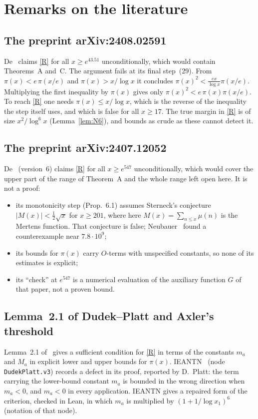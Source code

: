 \documentclass{amsart}
\theoremstyle{definition}
\theoremstyle{remark}
\theoremstyle{plain}
\numberwithin{equation}{section}
\begin{document}
\section{Remarks on the literature}\label{sec:lit}

\subsection{The preprint arXiv:2408.02591}
De~\cite{De24b} claims \eqref{R} for all $x\ge e^{43.51}$ unconditionally, which would contain Theorems~A and~C. The argument fails at its final step~(29). From $\pi(x)<e\,\pi(x/e)$ and $\pi(x)>x/\log x$ it concludes $\pi(x)^2<\frac{ex}{\log x}\pi(x/e)$. Multiplying the first inequality by $\pi(x)$ gives only $\pi(x)^2<e\,\pi(x)\pi(x/e)$. To reach \eqref{R} one needs $\pi(x)\le x/\log x$, which is the reverse of the inequality the step itself uses, and which is false for all $x\ge17$. The true margin in \eqref{R} is of size $x^2/\log^6x$ (Lemma~\ref{lem:N6}), and bounds as crude as these cannot detect it.

\subsection{The preprint arXiv:2407.12052}
De~\cite{De24a} (version~6) claims \eqref{R} for all $x\ge e^{547}$ unconditionally, which would cover the upper part of the range of Theorem~A and the whole range left open here. It is not a proof:
\begin{itemize}
\item its monotonicity step (Prop.~6.1) assumes Sterneck's conjecture $|M(x)|<\frac12\sqrt x$ for $x\ge201$, where here $M(x)=\sum_{n\le x}\mu(n)$ is the Mertens function. That conjecture is false; Neubauer~\cite{Neu63} found a counterexample near $7.8\cdot10^9$;
\item its bounds for $\pi(x)$ carry $O$-terms with unspecified constants, so none of its estimates is explicit;
\item its ``check'' at $e^{547}$ is a numerical evaluation of the auxiliary function $G$ of that paper, not a proven bound.
\end{itemize}

\subsection{Lemma~2.1 of Dudek--Platt and Axler's threshold}\label{sec:DP}
Lemma~2.1 of~\cite{DP15} gives a sufficient condition for \eqref{R} in terms of the constants $m_a$ and $M_a$ in explicit lower and upper bounds for $\pi(x)$. IEANTN~\cite{IEANTN} (node \texttt{DudekPlatt.v3}) records a defect in its proof, reported by D.~Platt: the term carrying the lower-bound constant $m_a$ is bounded in the wrong direction when $m_a<0$, and $m_a<0$ in every application. IEANTN gives a repaired form of the criterion, checked in Lean, in which $m_a$ is multiplied by $(1+1/\log x_1)^6$ (notation of that node).
\end{document}
